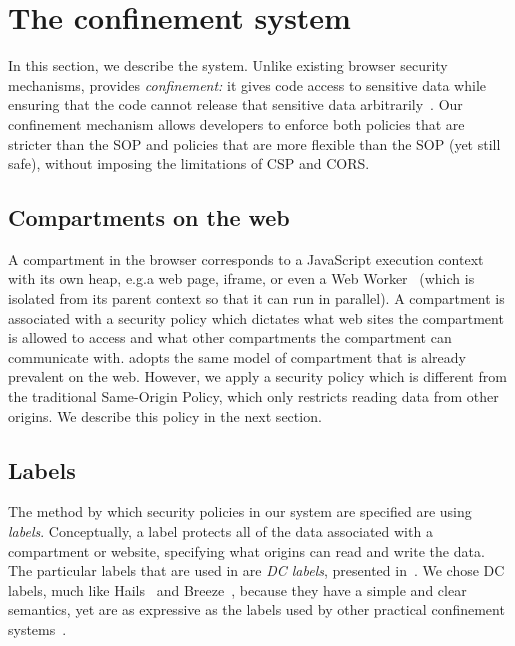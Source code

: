 \section{The \sys{} confinement system}
\label{sec:system}

In this section, we describe the \sys{} system.
%
Unlike existing browser security mechanisms, \sys{} provides
\emph{confinement:} it gives code access to sensitive
data while ensuring that the code cannot release that sensitive
data arbitrarily~\cite{SaltzerS75}.
%
Our confinement mechanism allows developers to enforce both policies
that are stricter than the SOP and policies that are more flexible
than the SOP (yet still safe), without imposing the limitations of CSP
and CORS\@.

\subsection{Compartments on the web}

A compartment in the browser corresponds to a JavaScript execution
context with its own heap, e.g.\@ a web page, iframe, or even a Web
Worker~\cite{workers} (which is isolated from its parent context so that
it can run in parallel).  A compartment is associated with a security
policy which dictates what web sites the compartment is allowed to
access and what other compartments the compartment can communicate with.
\sys{} adopts the same model of compartment that is already prevalent on
the web. However, we apply a security policy which is different
from the traditional Same-Origin Policy, which only restricts reading
data from other origins.  We describe this policy in the next section.

\subsection{Labels}

The method by which security policies in our system are specified
are using \emph{labels}.
%
Conceptually, a label protects all of the data associated with a
compartment or website, specifying what origins can read and write the data.
%
The particular labels that are used in \sys{} are \emph{DC
labels}, presented in~\cite{stefan:2011:dclabels}.
%
We chose DC labels, much like Hails~\cite{giffin:2012:hails} and
Breeze~\cite{Breeze13}, because they have a simple and clear
semantics, yet are as expressive as the labels used by other practical
confinement systems~\cite{GenLabels}.

